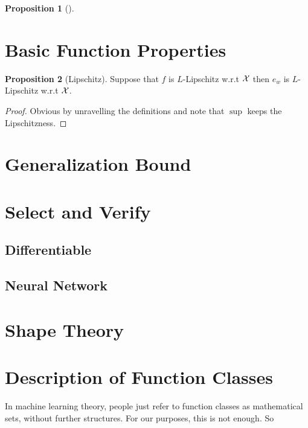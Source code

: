 \documentclass[11pt, oneside]{article}   	%
\theoremstyle{definition}
\newtheorem*{prop}{Proposition}
\begin{document}
\begin{prop}[]
	
\end{prop}

\section{Basic Function Properties}

\begin{prop}
	[Lipschitz] Suppose that $f$ is $L$-Lipschitz w.r.t $\mathcal{X}$ then $e_w$ is $L$-Lipschitz w.r.t $\mathcal{X}$.
\end{prop}

\begin{proof}
	Obvious by unravelling the definitions and note that $\sup$ keeps the Lipschitzness.
\end{proof}



\section{Generalization Bound}


\section{Select and Verify}

\subsection{Differentiable}

\subsection{Neural Network}

\section{Shape Theory}


\appendix

\section{Description of Function Classes}

In machine learning theory, people just refer to function classes as mathematical sets, without further structures. For our purposes, this is not enough. So
\end{document}
